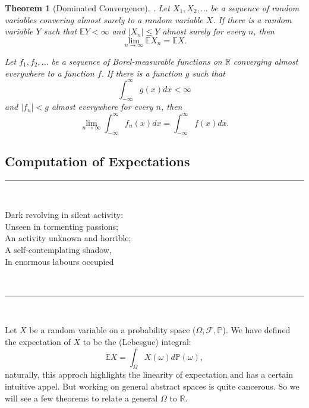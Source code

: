 \documentclass[reqno,a4paper,12pt]{amsart}%
\numberwithin{equation}{section}
\newtheorem{theorem}{Theorem}
\theoremstyle{definition}
\newcommand{\Ee}{{\mathbb{E}}}
\newcommand{\Pp}{{\mathbb{P}}}
\newcommand{\Rr}{{\mathbb{R}}}
\begin{document}
\begin{theorem}
	[Dominated Convergence]. Let $X_1,X_2,...$ be a sequence of random variables convering almost surely to a random variable $X$. If there is a random variable $Y$ such that $\Ee Y < \infty $ and $|X_n|\leq Y$ almost surely for every $n$, then 
	  $$\lim_{n\to \infty} \Ee X_n = \Ee X. $$
	 
	Let $f_1,f_2,...$ be a sequence of Borel-measurable functions on $\Rr$ converging almost everywhere to a function $f$. If there is a function $g$ such that $$\int_{-\infty}^\infty g(x)dx < \infty $$ and $|f_n|<g$ almost everywhere for every $n$, then 
	 $$\lim_{n\to \infty}  \int_{-\infty}^{\infty} f_n(x)dx = \int_{-\infty}^{\infty} f(x)dx. $$
		
\end{theorem}
 
\subsection{Computation of Expectations}

\begin{center}
	\par\noindent\rule{200pt}{0.1pt}
\end{center}



\
	 
\begin{center}
Dark revolving in silent activity: \\
Unseen in tormenting passions; \\
An activity unknown and horrible; \\
A self-contemplating shadow, \\
In enormous labours occupied
\end{center}

\
\begin{center}
	\par\noindent\rule{200pt}{0.1pt}
\end{center}	
	
\	

Let $X$ be a random variable on a probability space ($\Omega, \mathcal{F}, \Pp$). We have defined the expectation of $X$ to be the (Lebesgue) integral:
$$\Ee X = \int_\Omega X(\omega)d \Pp (\omega), $$ naturally, this approch highlights the linearity of expectation and has a certain intuitive appel. 
But working on general abstract spaces is quite cancerous. So we will see a few theorems to relate a general $\Omega$ to $\Rr.$
\end{document}
